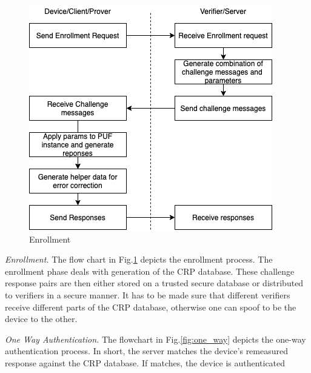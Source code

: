 \documentclass[journal, a4paper]{IEEEtran}
\begin{document}
\begin{figure}[!hbt]
    \begin{center}
    \includegraphics[scale=0.5]{figs/enrollment.png}
    \setlength{\belowcaptionskip}{-20pt}
    \caption{Enrollment}
    \label{fig:enroll}
    \end{center}
\end{figure}

\textit{Enrollment.} The flow chart in Fig.\ref{fig:enroll} depicts the enrollment process. The enrollment phase deals with generation of the CRP database. These challenge response pairs are then either stored on a trusted secure database or distributed to verifiers in a secure manner. It has to be made sure that different verifiers receive different parts of the CRP database, otherwise one can spoof to be the device to the other.

\textit{One Way Authentication.} The flowchart in Fig.\ref{fig:one_way} depicts the one-way authentication process. In short, the server matches the device's remeasured response against the CRP database. If matches, the device is authenticated
\end{document}
